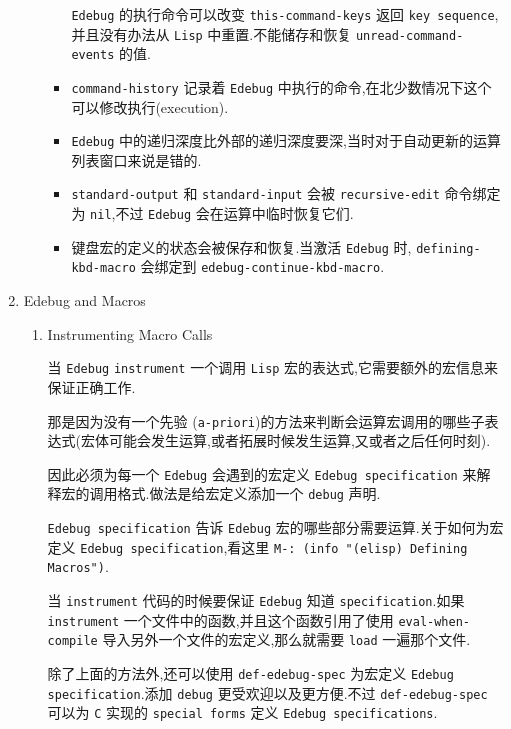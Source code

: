 \documentclass[11pt]{article}
\begin{document}
\begin{enumerate}
\begin{enumerate}
\begin{itemize}
\texttt{Edebug} 的执行命令可以改变 \texttt{this-command-keys} 返回 \texttt{key sequence},并且没有办法从 \texttt{Lisp} 中重置.不能储存和恢复 \texttt{unread-command-events} 的值.

\item \texttt{command-history} 记录着 \texttt{Edebug} 中执行的命令,在北少数情况下这个可以修改执行(execution).

\item \texttt{Edebug} 中的递归深度比外部的递归深度要深,当时对于自动更新的运算列表窗口来说是错的.

\item \texttt{standard-output} 和 \texttt{standard-input} 会被 \texttt{recursive-edit} 命令绑定为 \texttt{nil},不过 \texttt{Edebug} 会在运算中临时恢复它们.

\item 键盘宏的定义的状态会被保存和恢复.当激活 \texttt{Edebug} 时, \texttt{defining-kbd-macro} 会绑定到 \texttt{edebug-continue-kbd-macro}.
\end{itemize}
\end{enumerate}


\item Edebug and Macros
\label{sec:org1280493}
\begin{enumerate}
\item Instrumenting Macro Calls
\label{sec:orgec25c1d}

当 \texttt{Edebug} \texttt{instrument} 一个调用 \texttt{Lisp} 宏的表达式,它需要额外的宏信息来保证正确工作.

那是因为没有一个先验 (\texttt{a-priori})的方法来判断会运算宏调用的哪些子表达式(宏体可能会发生运算,或者拓展时候发生运算,又或者之后任何时刻).

因此必须为每一个 \texttt{Edebug} 会遇到的宏定义 \texttt{Edebug specification} 来解释宏的调用格式.做法是给宏定义添加一个 \texttt{debug} 声明.

\texttt{Edebug specification} 告诉 \texttt{Edebug} 宏的哪些部分需要运算.关于如何为宏定义 \texttt{Edebug specification},看这里 \texttt{M-: (info "(elisp) Defining Macros")}.

当 \texttt{instrument} 代码的时候要保证 \texttt{Edebug} 知道 \texttt{specification}.如果 \texttt{instrument} 一个文件中的函数,并且这个函数引用了使用 \texttt{eval-when-compile} 导入另外一个文件的宏定义,那么就需要 \texttt{load} 一遍那个文件.

除了上面的方法外,还可以使用 \texttt{def-edebug-spec} 为宏定义 \texttt{Edebug specification}.添加 \texttt{debug} 更受欢迎以及更方便.不过 \texttt{def-edebug-spec} 可以为 \texttt{C} 实现的 \texttt{special forms} 定义 \texttt{Edebug specifications}.


\end{enumerate}
\end{enumerate}
\end{document}

